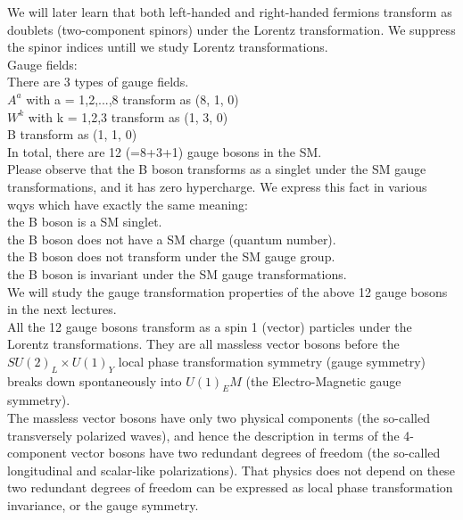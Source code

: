 \documentclass[12pt]{article}
\begin{document}
  We will later learn that both left-handed and right-handed
  fermions transform as doublets (two-component spinors) under
  the Lorentz transformation.  We suppress the spinor indices
  untill we study Lorentz transformations.\\

  Gauge fields:\\

  There are 3 types of gauge fields.\\

  $A^a$ with a = 1,2,...,8 transform as (8, 1, 0)\\
  $W^k$ with k = 1,2,3     transform as (1, 3, 0)\\
  B                      transform as (1, 1, 0)\\

  In total, there are 12 (=8+3+1) gauge bosons in the SM.\\

  Please observe that the B boson transforms as a singlet
  under the SM gauge transformations, and it has zero hypercharge.
  We express this fact in various wqys which have exactly the
  same meaning:\\

   the B boson is a SM singlet.\\
   the B boson does not have a SM charge (quantum number).\\
   the B boson does not transform under the SM gauge group.\\
   the B boson is invariant under the SM gauge transformations.\\

  We will study the gauge transformation properties of the above
  12 gauge bosons in the next lectures.\\

  All the 12 gauge bosons transform as a spin 1 (vector) particles
  under the Lorentz transformations.  They are all massless vector
  bosons before the $SU(2)_L \times U(1)_Y$ local phase transformation
  symmetry (gauge symmetry) breaks down spontaneously into
  $U(1)_EM$ (the Electro-Magnetic gauge symmetry).\\

  The massless vector bosons have only two physical components
  (the so-called transversely polarized waves), and hence
  the description in terms of the 4-component vector bosons
  have two redundant degrees of freedom (the so-called longitudinal
  and scalar-like polarizations).  That physics does not depend
  on these two redundant degrees of freedom can be expressed as
  local phase transformation invariance, or the gauge symmetry.\\
\end{document}
